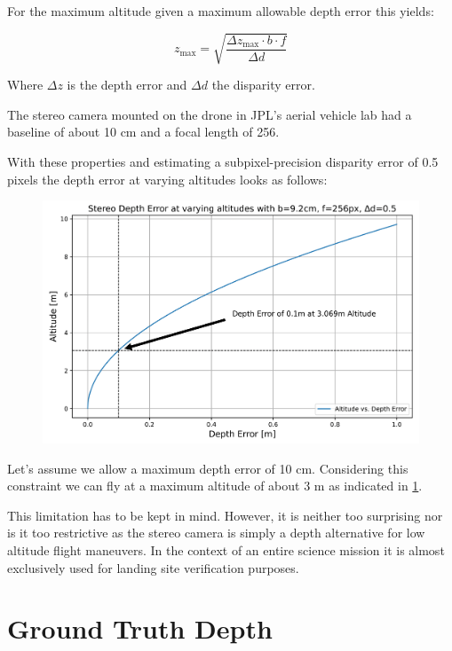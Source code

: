 For the maximum altitude given a maximum allowable depth error this yields:

\begin{equation}
    z_{\text{max}} = \sqrt{\frac{\Delta z_{\text{max}} \cdot b \cdot f}{\Delta d}}
\end{equation}

Where $\Delta z$ is the depth error and $\Delta d$ the disparity error.

The stereo camera mounted on the drone in JPL's aerial vehicle lab had a baseline of about 10 cm and a focal length of 256.

With these properties and estimating a subpixel-precision disparity error of 0.5 pixels the depth error at varying altitudes looks as follows:

\begin{figure}
    \centering
    \includegraphics[scale=0.19]{images/preparation/stereo_limit.png}
    \label{fig:stereo_limit}
\end{figure}

Let's assume we allow a maximum depth error of 10 cm. Considering this constraint we can fly at a maximum altitude of about 3 m as indicated in \cref{fig:stereo_limit}.

This limitation has to be kept in mind. However, it is neither too surprising nor is it too restrictive as the stereo camera is simply a depth alternative for low altitude flight maneuvers. In the context of an entire science mission it is almost exclusively used for landing site verification purposes.

\section{Ground Truth Depth}

